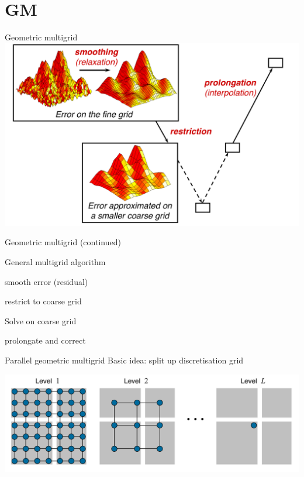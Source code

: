 \documentclass[12pt]{beamer}
\begin{document}
\section{GM}
\begin{frame}{Geometric multigrid}
  \includegraphics[width=1\textwidth]{Vcycle}
\end{frame}


\begin{frame}{Geometric multigrid (continued)}

General multigrid algorithm
\begin{description}[align=right]
  \item[Step 1:] smooth error (residual)
  \item[Step 2:] restrict to coarse grid
  \item[Step 3:] Solve on coarse grid
  \item[Step 4:] prolongate and correct
\end{description}

\end{frame}


\begin{frame}{Parallel geometric multigrid}
Basic idea: split up discretisation grid

\begin{center}
  \includegraphics[width=.75\textwidth]{PGM.png}
\end{center}

\end{frame}
\end{document}
